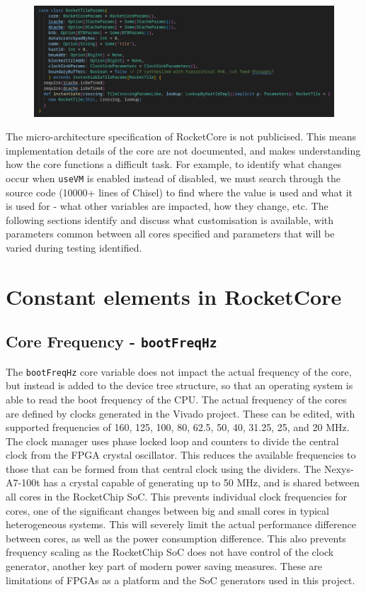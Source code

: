 \begin{figure}
    \includegraphics[]{./img/rocket_tile_params.png}
\end{figure}

The micro-architecture specification of RocketCore is not publicised. This means implementation details of the core are not documented, and makes understanding how the core functions a difficult task. For example, to identify what changes occur when \texttt{useVM} is enabled instead of disabled, we must search through the source code (10000+ lines of Chisel\cite{}) to find where the value is used and what it is used for - what other variables are impacted, how they change, etc. The following sections identify and discuss what customisation is available, with parameters common between all cores specified and parameters that will be varied during testing identified.
\section{Constant elements in RocketCore}
\subsection{Core Frequency - \texttt{bootFreqHz}}
The \texttt{bootFreqHz} core variable does not impact the actual frequency of the core, but instead is added to the device tree structure, so that an operating system is able to read the boot frequency of the CPU. The actual frequency of the cores are defined by clocks generated in the Vivado project. These can be edited, with supported frequencies of 160, 125, 100, 80, 62.5, 50, 40, 31.25, 25, and 20 MHz. The clock manager uses phase locked loop and counters to divide the central clock from the FPGA crystal oscillator. This reduces the available frequencies to those that can be formed from that central clock using the dividers. The Nexys-A7-100t has a crystal capable of generating up to 50 MHz, and is shared between all cores in the RocketChip SoC. This prevents individual clock frequencies for cores, one of the significant changes between big and small cores in typical heterogeneous systems. This will severely limit the actual performance difference between cores, as well as the power consumption difference. This also prevents frequency scaling as the RocketChip SoC does not have control of the clock generator, another key part of modern power saving measures. These are limitations of FPGAs as a platform and the SoC generators used in this project.

